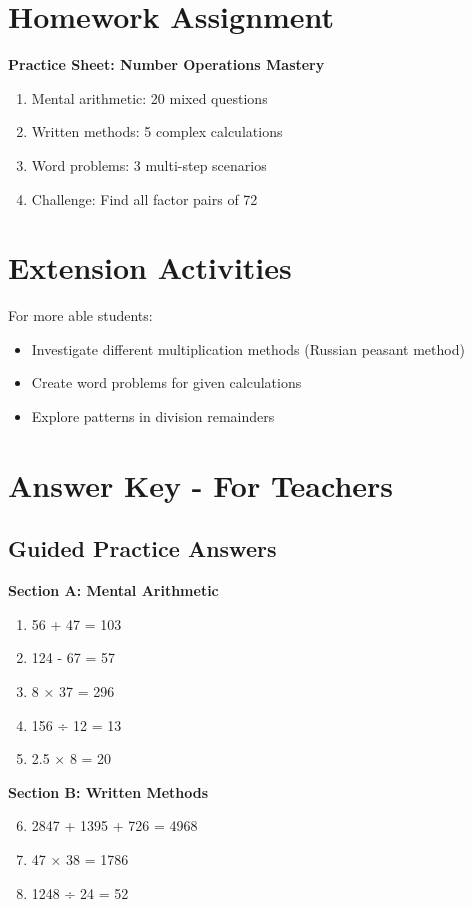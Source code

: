 \documentclass{article}
\begin{document}
\section{Homework Assignment}

\textbf{Practice Sheet: Number Operations Mastery}
\begin{enumerate}
    \item Mental arithmetic: 20 mixed questions
    \item Written methods: 5 complex calculations
    \item Word problems: 3 multi-step scenarios
    \item Challenge: Find all factor pairs of 72
\end{enumerate}

\section{Extension Activities}

For more able students:
\begin{itemize}
    \item Investigate different multiplication methods (Russian peasant method)
    \item Create word problems for given calculations
    \item Explore patterns in division remainders
\end{itemize}

\newpage

\section*{Answer Key - For Teachers}

\subsection*{Guided Practice Answers}

\textbf{Section A: Mental Arithmetic}
\begin{enumerate}
    \item 56 + 47 = 103
    \item 124 - 67 = 57
    \item 8 × 37 = 296
    \item 156 ÷ 12 = 13
    \item 2.5 × 8 = 20
\end{enumerate}

\textbf{Section B: Written Methods}
\begin{enumerate}
    \setcounter{enumi}{5}
    \item 2847 + 1395 + 726 = 4968
    \item 47 × 38 = 1786
    \item 1248 ÷ 24 = 52
\end{enumerate}
\end{document}
